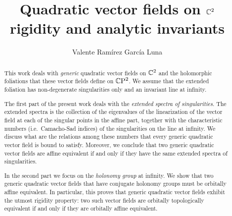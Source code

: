 \documentclass[phd,tocprelim]{cornell}
\title {Quadratic vector fields on \texorpdfstring{$\mathbb{C}^2$}{C2}\\rigidity and analytic invariants}
\author {Valente Ram\'{i}rez Garc\'{i}a Luna}
\begin{document}
\maketitle

\cleardoublepage{} %
\begin{abstract}
 This work deals with \textit{generic} quadratic vector fields on $\mathbb{C}^2$ and the holomorphic foliations that these vector fields define on $\mathbb{C}\mathrm{P}^2$. We assume that the extended foliation has non-degenerate singularities only and an invariant line at infinity.
 
 The first part of the present work deals with the \textit{extended spectra of singularities}. The extended spectra is the collection of the eigenvalues of the linearization of the vector field at each of the singular points in the affine part, together with the characteristic numbers (i.e.~Camacho-Sad indices) of the singularities on the line at infinity. We discuss what are the relations among these numbers that every generic quadratic vector field is bound to satisfy. Moreover, we conclude that two generic quadratic vector fields are affine equivalent if and only if they have the same extended spectra of singularities.
 
 In the second part we focus on the \textit{holonomy group} at infinity. We show that two generic quadratic vector fields that have conjugate holonomy groups must be orbitally affine equivalent. In particular, this proves that generic quadratic vector fields exhibit the utmost rigidity property: two such vector fields are orbitally topologically equivalent if and only if they are orbitally affine equivalent.

\begin{metadata} %
 
\end{metadata}
\end{abstract}


\end{document}
